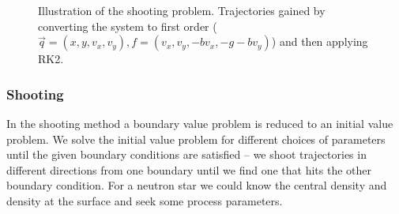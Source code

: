\begin{figure}[!htb]
  \centering
  \hfill
  \caption{Illustration of the shooting problem. Trajectories gained by converting the system to first order ($\vec{q} = (x,y,v_x,v_y), f = (v_x,v_y,-bv_x,-g-bv_y)$) and then applying RK2.}
  \label{fig:shooting_problem}
\end{figure}
  
\subsubsection{Shooting}
In the shooting method a boundary value problem is reduced to an initial value problem. We solve the initial value problem 
for different choices of parameters 
until the given boundary conditions 
are satisfied – \textcolor{blue1}{we shoot trajectories in different directions from one boundary until we find one that hits the other boundary condition}.
For a neutron star we could know the central density and density at the surface and seek some process parameters.

\pagebreak
